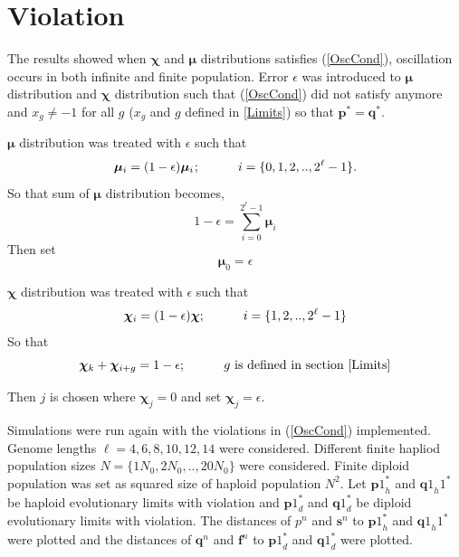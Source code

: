 \section{Violation}
The results showed when $\bm{\chi}$ and $\bm{\mu}$ distributions satisfies (\ref{OscCond}), oscillation occurs in both infinite and finite population. 
Error $\epsilon$ was introduced to $\bm{\mu}$ distribution and $\bm{\chi}$ distribution such that (\ref{OscCond}) did not satisfy anymore and 
$x_g \neq −1$ for all $g$ ($x_g$ and $g$ defined in \ref{Limits}) so that $\bm{p}^\ast = \bm{q}^\ast$.

$\bm{\mu}$ distribution was treated with $\epsilon$ such that
\[
\bm{\mu}_i = (1-\epsilon) \bm{\mu}_i \hspace{0.01in}; \hspace{30pt} i = \{0, 1, 2,.., 2^{\ell}-1\}.
\]
So that sum of $\bm{\mu}$ distribution becomes, 
\[
1-\epsilon = \sum \limits_{i=0}^{2^{\ell}-1} \bm{\mu}_i
\]
Then set
\[
\bm{\mu}_0 = \epsilon
\]

$\bm{\chi}$ distribution was treated with $\epsilon$ such that
\[
\bm{\chi}_i = (1-\epsilon) \bm{\chi} ; \hspace{30pt} i = \{1, 2,.., 2^{\ell}-1\} 
\]
So that 
\[
\bm{\chi}_k + \bm{\chi}_{i+g} = 1-\epsilon ; \hspace{30pt} g \text{ is defined in  section } \ref{Limits}
\]

Then $j$ is chosen where $\bm{\chi}_j = 0$ and set $\bm{\chi}_j = \epsilon$. \newline

Simulations were run again with the violations in (\ref{OscCond}) implemented. Genome lengths $\ell = {4, 6, 8, 10, 12, 14}$ were considered. 
Different finite hapliod population sizes $N = \{1N_0, 2N_0,.., 20N_0\}$ were considered. Finite diploid population was set as 
squared size of haploid population $N^2$.\newline
Let ${\bm{p}1}_h^{\ast}$ and ${\bm{q}1}_h1^{\ast}$ be haploid evolutionary limits with violation and ${\bm{p}1}_d^{\ast}$ and ${\bm{q}1}_d^{\ast}$ be diploid 
evolutionary limits with violation. The distances of ${p}^n$ and $\bm{s}^n$ to ${\bm{p}1}_h^{\ast}$ and ${\bm{q}1}_h1^{\ast}$ were plotted and the distances of 
$\bm{q}^n$ and $\bm{f}^n$ to ${\bm{p}1}_d^{\ast}$ and ${\bm{q}1}_d^{\ast}$ were plotted.



